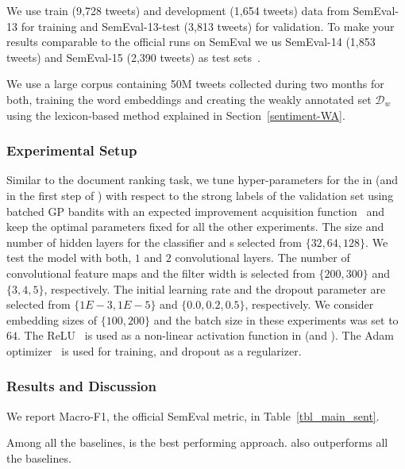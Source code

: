 We use train (9,728 tweets) and development (1,654 tweets) data from SemEval-13 for training and SemEval-13-test (3,813 tweets) for validation.
To make your results comparable to the official runs on SemEval we us SemEval-14 (1,853 tweets) and  SemEval-15 (2,390 tweets) as test sets~\citep{rosenthal:2015, Nakov:2016}.

We use a large corpus containing 50M tweets collected during two months for both, training the word embeddings and creating the weakly annotated set $\mathcal{D}_w$ using the lexicon-based method explained in Section~\ref{sentiment-WA}. 

\subsubsection{Experimental Setup}
Similar to the document ranking task, we tune hyper-parameters for the \tnet in \cws (and \std in the first step of \fwl) with respect to the strong labels of the validation set using batched GP bandits with an expected improvement acquisition function~\citep{Desautels:2014} and keep the optimal parameters fixed for all the other experiments.  
The size and number of hidden layers for the classifier and s selected from $\{32, 64, 128\}$.
We test the model with both, $1$ and $2$ convolutional layers. The number of convolutional feature maps and the filter width is selected from $\{200,300\}$ and $\{ 3, 4, 5\}$, respectively. The initial learning rate and the dropout parameter are selected from $\{1E-3, 1E-5\}$ and $\{0.0, 0.2, 0.5\}$, respectively. We consider embedding sizes of $\{100, 200\}$ and the batch size in these experiments was set to $64$. The ReLU~\citep{Nair:2010} is used as a non-linear activation function in \tnet (and \std). The Adam optimizer~\citep{Kingma:2014} is used for training, and dropout as a regularizer.



\subsubsection{Results and Discussion} 

We report Macro-F1, the official SemEval metric, in Table~\ref{tbl_main_sent}. 

Among all the baselines, \fwl is the best performing approach. \cws also outperforms all the baselines. 

